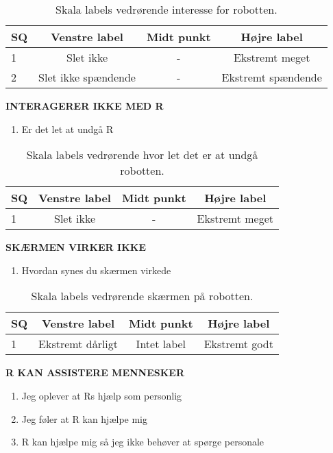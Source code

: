 %
\begin{table}[H]
	\centering 
	\begin{tabular}{l|c|c|c}
		SQ     & Venstre label & Midt punkt & Højre label \\\hline
		1   & Slet ikke & - & Ekstremt meget          \\\hline
		2   & Slet ikke spændende & - & Ekstremt spændende                 
	\end{tabular}
\caption{Skala labels vedrørende interesse for robotten.}
	\label{tab:InteresseForR}
\end{table}
\noindent
%
\textbf{INTERAGERER IKKE MED R}\\
%
\begin{enumerate}
  \item Er det let at undgå R
\end{enumerate} 
%
\begin{table}[H]
	\centering
	\begin{tabular}{l|c|c|c}
		SQ     & Venstre label & Midt punkt & Højre label \\\hline
		1   & Slet ikke & - & Ekstremt meget                 
	\end{tabular}
\caption{Skala labels vedrørende hvor let det er at undgå robotten.}
	\label{tab:IgnorerR} 
\end{table}
\noindent
%
\textbf{SKÆRMEN VIRKER IKKE}\\
%
\begin{enumerate}
  \item Hvordan synes du skærmen virkede
\end{enumerate}
%
\begin{table}[H]
	\centering 
	\begin{tabular}{l|c|c|c}
		SQ     & Venstre label & Midt punkt & Højre label \\\hline
		1   & Ekstremt dårligt & Intet label & Ekstremt godt                 
	\end{tabular}
\caption{Skala labels vedrørende skærmen på robotten.}
	\label{tab:SkaermenR}
\end{table}
\noindent
%
\textbf{R KAN ASSISTERE MENNESKER}\\
%
\begin{enumerate}
  \item Jeg oplever at Rs hjælp som personlig
  \item Jeg føler at R kan hjælpe mig
  \item R kan hjælpe mig så jeg ikke behøver at spørge personale
\end{enumerate}
